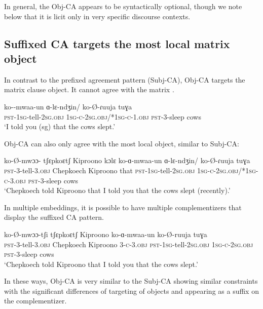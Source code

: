 \documentclass[output=paper
,newtxmath
,modfonts
,nonflat]{langsci/langscibook}
\begin{document}
\noindent In general, the Obj-CA appears to be syntactically optional, though we note below that it is licit only in very specific discourse contexts.  

\subsection{Suffixed CA targets the most local matrix object}

In contrast to the prefixed agreement pattern (Subj-CA), Obj-CA targets the matrix clause object. It cannot agree with the matrix .

\ea 
\gll ko--mwaa-un ɑ-lɛ-ndʒin/ ko-\O-ɾuuja tuɣa \\
\textsc{pst}-1\textsc{sg}-tell-2\textsc{sg}.\textsc{obj} 1\textsc{sg-c-}2\textsc{sg}.\textsc{obj}/*1\textsc{sg-c-}1\textsc{}.\textsc{obj} \textsc{pst}-3-sleep cows \\
\glt `I told you (sg) that the cows slept.'
\z

\noindent Obj-CA can also only agree with the most local object, similar to Subj-CA: 

\ea
\gll ko-\O-mwɔɔ- tʃɛpkoɛtʃ Kiproono kɔlɛ ko-ɑ-mwaa-un ɑ-lɛ-ndʒin/ ko-\O-ɾuuja tuɣa \\
\textsc{pst}-3-tell-3.\textsc{obj} Chepkoech Kiproono that \textsc{pst}-1\textsc{sg}-tell-2\textsc{sg}.\textsc{obj} 1\textsc{sg-c-}2\textsc{sg}.\textsc{obj}/*1\textsc{sg-c-}3.\textsc{obj} \textsc{pst}-3-sleep cows \\
\glt `Chepkoech told Kiproono that I told you that the cows slept (recently).'
\z

\noindent In multiple embeddings, it is possible to have multiple complementizers that display the suffixed CA pattern.

\ea
\gll ko-\O-mwɔɔ-tʃi tʃɛpkoɛtʃ Kiproono  ko-ɑ-mwaa-un  ko-\O-ruuja tuɣa \\
\textsc{pst}-3-tell-3.\textsc{obj} Chepkoech Kiproono 3-\textsc{c}-3.\textsc{obj} \textsc{pst}-1\textsc{sg}-tell-2\textsc{sg}.\textsc{obj} 1\textsc{sg-c-}2\textsc{sg}.\textsc{obj} \textsc{pst}-3-sleep cows \\
\glt `Chepkoech told Kiproono that I told you that the cows slept.'
\z

\noindent In these ways, Obj-CA is very similar to the Subj-CA \textendash showing similar  constraints \textendash with the significant differences of targeting of objects and appearing as a suffix on the complementizer.
\end{document}
